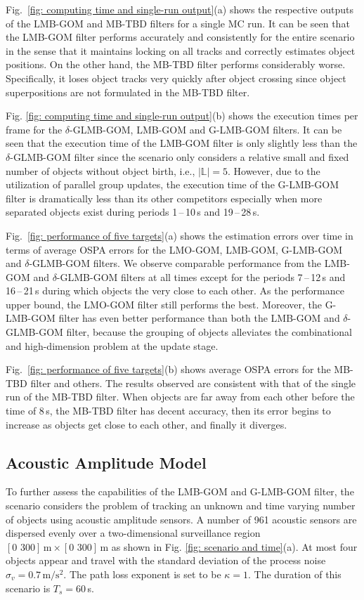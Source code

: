 \documentclass[journal]{IEEEtran}
\begin{document}
{Fig.~\ref{fig: computing time and single-run output}(a) shows the respective outputs of the LMB-GOM  and MB-TBD filters for a single MC run.   It can be seen that the LMB-GOM filter performs accurately and consistently for the entire scenario
in the sense that it maintains locking on all tracks and correctly
estimates object positions.
On the other hand, the MB-TBD filter performs considerably worse.  Specifically,  it loses object tracks very quickly after object crossing since  object superpositions are 
not formulated in the MB-TBD filter.


Fig. \ref{fig: computing time and single-run output}(b) shows the execution times per frame for the $\delta$-GLMB-GOM, LMB-GOM and G-LMB-GOM filters. It can be seen that the execution  time of the LMB-GOM filter is only slightly less than the $\delta$-GLMB-GOM filter since the scenario only considers a relative small and fixed number of objects without object birth, i.e., $|\mathbb{L}|=5$. However, due to the utilization of  parallel group updates, the execution time of the G-LMB-GOM filter is dramatically less than its other competitors especially when more separated objects exist during periods 1\,--\,10\,s and 19\,--\,28\,s.


Fig.~\ref{fig: performance of five targets}(a) shows  the estimation errors over time in terms of average OSPA errors   for the LMO-GOM,  LMB-GOM,  G-LMB-GOM and $\delta$-GLMB-GOM  filters.  We observe comparable performance from the LMB-GOM and $\delta$-GLMB-GOM filters at all times except for the periods 7\,--\,12\,s and 16\,--\,21\,s during which objects the very close to each other. As the performance upper bound, the LMO-GOM filter still performs the best. Moreover, the G-LMB-GOM filter  has even better performance than both the LMB-GOM and $\delta$-GLMB-GOM filter, because the grouping of objects alleviates the combinational and  high-dimension problem at the update stage.

Fig.~\ref{fig: performance of five targets}(b)  shows average OSPA errors for the MB-TBD filter and others. The results observed are consistent  with that of the single run of the MB-TBD filter. When objects are far away from each other before the time of 8\,s, the MB-TBD filter has decent accuracy, then its error begins to increase as objects get close to each other, and finally it diverges.

\subsection{Acoustic Amplitude Model}
To further assess  the capabilities of the LMB-GOM and G-LMB-GOM filter,  the scenario considers the problem of tracking an unknown and time varying number of objects using acoustic amplitude sensors.   
A number of  961 acoustic sensors  are dispersed evenly over a two-dimensional surveillance region $[0\,\, 300]\,\text{m}\times[0\,\,300]\,\text{m}$  as shown in Fig. \ref{fig: scenario and time}(a).   At most four objects appear and travel with the standard deviation of the process noise $\sigma_{v}=0.7\,\text{m}/\text{s}^{2}$.  The path loss exponent is set to be $\kappa=1$.  The duration of this scenario is  $T_s=60$\,s.
 
}
\end{document}
